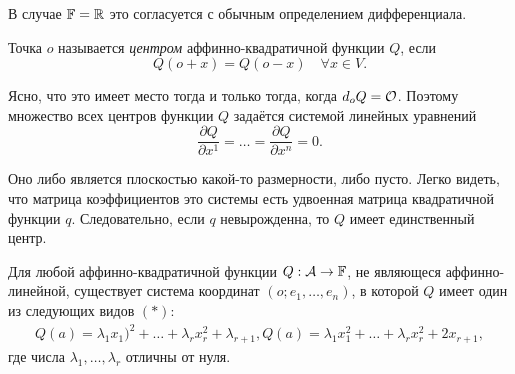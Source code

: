 В случае $\mathbb{F} = \mathbb{R}$ это согласуется с обычным определением дифференциала.

\begin{definition}
    Точка $o$ называется \textit{центром} аффинно-квадратичной функции $Q$, если
    \[
        Q(o + x) = Q(o - x)\quad\forall x \in V.
    \]
\end{definition}

Ясно, что это имеет место тогда и только тогда, когда $d_oQ = \mathcal{O}$. Поэтому множество всех центров функции $Q$ задаётся системой линейных уравнений
\[
    \frac{\partial Q}{\partial x^1} = \ldots = \frac{\partial Q}{\partial x^n} = 0.
\]

Оно либо является плоскостью какой-то размерности, либо пусто. Легко видеть, что матрица коэффициентов это системы есть удвоенная матрица квадратичной функции $q$. Следовательно, если $q$ невырожденна, то $Q$ имеет единственный центр.

\begin{theorem}
    Для любой аффинно-квадратичной функции $Q: \mathcal{A} \to \mathbb{F}$, не являющеся аффинно-линейной, существует система координат $(o; e_1, \ldots, e_n)$, в которой $Q$ имеет один из следующих видов $(\ast)$:
    \begin{gather*}
        Q(a) = \lambda_1x_1)^2 + \ldots + \lambda_rx_r^2 + \lambda_{r + 1},
        Q(a) = \lambda_1x_1^2 + \ldots + \lambda_rx_r^2 + 2x_{r + 1},
    \end{gather*}
    где числа $\lambda_1, \ldots, \lambda_r$ отличны от нуля.
\end{theorem}

